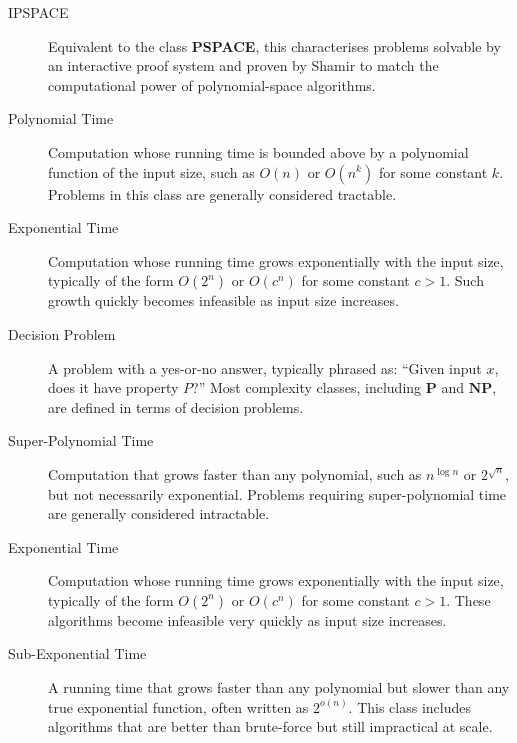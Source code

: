\documentclass[12pt]{report}
\begin{document}
\begin{description}
    \item[IPSPACE] Equivalent to the class \textbf{PSPACE}, this characterises problems solvable by an interactive proof system and proven by Shamir to match the computational power of polynomial-space algorithms.
    \item[Polynomial Time] Computation whose running time is bounded above by a polynomial function of the input size, such as $O(n)$ or $O(n^k)$ for some constant $k$. Problems in this class are generally considered tractable.
    \item[Exponential Time] Computation whose running time grows exponentially with the input size, typically of the form $O(2^n)$ or $O(c^n)$ for some constant $c>1$. Such growth quickly becomes infeasible as input size increases.
    \item[Decision Problem] A problem with a yes-or-no answer, typically phrased as: “Given input $x$, does it have property $P$?” Most complexity classes, including $\mathbf{P}$ and $\mathbf{NP}$, are defined in terms of decision problems.
    \item[Super-Polynomial Time] Computation that grows faster than any polynomial, such as $n^{\log n}$ or $2^{\sqrt{n}}$, but not necessarily exponential. Problems requiring super-polynomial time are generally considered intractable.
    \item[Exponential Time] Computation whose running time grows exponentially with the input size, typically of the form $O(2^n)$ or $O(c^n)$ for some constant $c > 1$. These algorithms become infeasible very quickly as input size increases.
    \item[Sub-Exponential Time] A running time that grows faster than any polynomial but slower than any true exponential function, often written as $2^{o(n)}$. This class includes algorithms that are better than brute-force but still impractical at scale.

\end{description}
\end{document}
